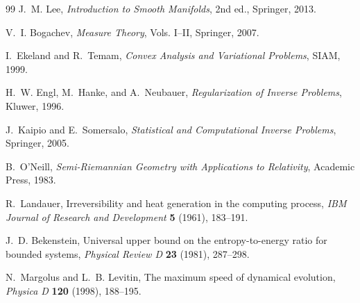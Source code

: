 \documentclass[11pt,a4paper]{article}
\theoremstyle{definition}
\theoremstyle{plain}
\theoremstyle{remark}
\begin{document}
{\small
\begin{thebibliography}{99}
J.~M. Lee,
\emph{Introduction to Smooth Manifolds}, 2nd ed.,
Springer, 2013.

V.~I. Bogachev,
\emph{Measure Theory}, Vols. I--II,
Springer, 2007.

I.~Ekeland and R.~Temam,
\emph{Convex Analysis and Variational Problems},
SIAM, 1999.

H.~W. Engl, M.~Hanke, and A.~Neubauer,
\emph{Regularization of Inverse Problems},
Kluwer, 1996.

J.~Kaipio and E.~Somersalo,
\emph{Statistical and Computational Inverse Problems},
Springer, 2005.

B.~O'Neill,
\emph{Semi-Riemannian Geometry with Applications to Relativity},
Academic Press, 1983.

R.~Landauer,
Irreversibility and heat generation in the computing process,
\emph{IBM Journal of Research and Development} \textbf{5} (1961),
183--191.

J.~D. Bekenstein,
Universal upper bound on the entropy-to-energy ratio for bounded systems,
\emph{Physical Review D} \textbf{23} (1981), 287--298.

N.~Margolus and L.~B. Levitin,
The maximum speed of dynamical evolution,
\emph{Physica D} \textbf{120} (1998), 188--195.
\end{thebibliography}
}
\end{document}
